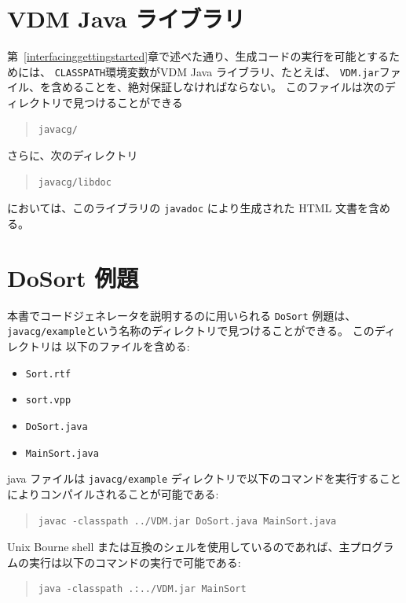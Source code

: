 \documentclass[\pformat,11pt]{jarticle}
\newcommand{\JL}{VDM Java ライブラリ}
\begin{document}
\newpage
\section{VDM Java ライブラリ}\label{VDMJavalib}

第~\ref{interfacinggettingstarted}章で述べた通り、生成コードの実行を可能とするためには、 {\tt CLASSPATH}環境変数が\JL{}、たとえば、 {\tt VDM.jar}ファイル、を含めることを、絶対保証しなければならない。
このファイルは次のディレクトリで見つけることができる

\begin{quote}
\begin{verbatim}
javacg/
\end{verbatim}
\end{quote}

さらに、次のディレクトリ

\begin{quote}
\begin{verbatim}
javacg/libdoc
\end{verbatim}
\end{quote}
においては、このライブラリの {\tt javadoc} により生成された HTML 文書を含める。

\newpage
\section{DoSort 例題}\label{dosortexample}
本書でコードジェネレータを説明するのに用いられる \texttt{DoSort} 例題は、{\tt javacg/example}という名称のディレクトリで見つけることができる。
このディレクトリは 以下のファイルを含める:

\begin{itemize}
\item {\tt Sort.rtf}
\item {\tt sort.vpp}
\item {\tt DoSort.java}
\item {\tt MainSort.java}
\end{itemize}

 java ファイルは {\tt javacg/example} ディレクトリで以下のコマンドを実行することによりコンパイルされることが可能である:

\begin{quote}
\begin{verbatim}
javac -classpath ../VDM.jar DoSort.java MainSort.java
\end{verbatim}
\end{quote}

 Unix Bourne shell または互換のシェルを使用しているのであれば、主プログラムの実行は以下のコマンドの実行で可能である:
\begin{quote}
\begin{verbatim}
java -classpath .:../VDM.jar MainSort
\end{verbatim}
\end{quote}
\end{document}
